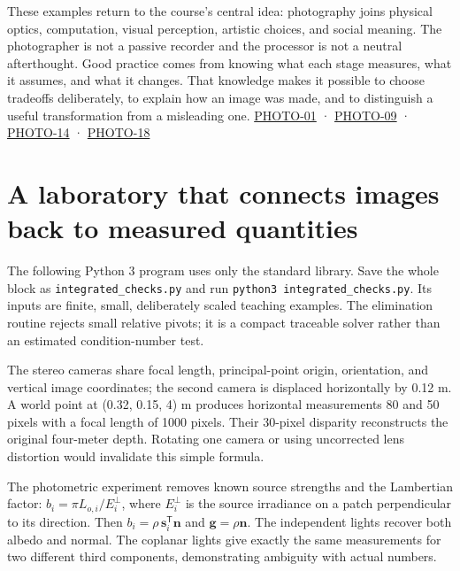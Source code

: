 These examples return to the course's central idea: photography joins physical optics, computation, visual perception, artistic choices, and social meaning. The photographer is not a passive recorder and the processor is not a neutral afterthought. Good practice comes from knowing what each stage measures, what it assumes, and what it changes. That knowledge makes it possible to choose tradeoffs deliberately, to explain how an image was made, and to distinguish a useful transformation from a misleading one. \hyperref[04-visual-computing-ii-ch036-photo-01---photography-session-01]{PHOTO-01} · \hyperref[04-visual-computing-ii-ch036-photo-09---photography-session-09]{PHOTO-09} · \hyperref[04-visual-computing-ii-ch036-photo-14---photography-session-14]{PHOTO-14} · \hyperref[04-visual-computing-ii-ch036-photo-18---photography-session-18]{PHOTO-18}

\section{A laboratory that connects images back to measured quantities}\label{04-visual-computing-ii-ch034-a-laboratory-that-connects-images-back-to-measured-quantities}

The following Python 3 program uses only the standard library. Save the whole block as \texttt{integrated\_checks.py} and run \texttt{python3\ integrated\_checks.py}. Its inputs are finite, small, deliberately scaled teaching examples. The elimination routine rejects small relative pivots; it is a compact traceable solver rather than an estimated condition-number test.

The stereo cameras share focal length, principal-point origin, orientation, and vertical image coordinates; the second camera is displaced horizontally by 0.12 m. A world point at (0.32, 0.15, 4) m produces horizontal measurements 80 and 50 pixels with a focal length of 1000 pixels. Their 30-pixel disparity reconstructs the original four-meter depth. Rotating one camera or using uncorrected lens distortion would invalidate this simple formula.

The photometric experiment removes known source strengths and the Lambertian factor: \(b_i=\pi L_{o,i}/E_i^\perp\), where \(E_i^\perp\) is the source irradiance on a patch perpendicular to its direction. Then \(b_i=\rho\,\mathbf s_i^\mathsf T\mathbf n\) and \(\mathbf g=\rho\mathbf n\). The independent lights recover both albedo and normal. The coplanar lights give exactly the same measurements for two different third components, demonstrating ambiguity with actual numbers.

